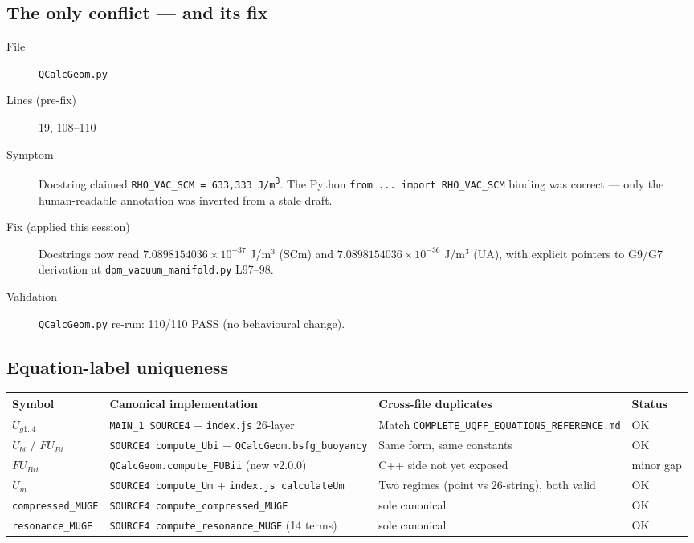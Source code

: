 \documentclass[11pt]{article}
\begin{document}
\subsection{The only conflict --- and its fix}
\label{sec:conflict}
\begin{description}
  \item[File] \texttt{QCalcGeom.py}
  \item[Lines (pre-fix)] 19, 108--110
  \item[Symptom] Docstring claimed \texttt{RHO\_VAC\_SCM = 633,333 J/m\textsuperscript{3}}. The Python \texttt{from ... import RHO\_VAC\_SCM} binding was correct --- only the human-readable annotation was inverted from a stale draft.
  \item[Fix (applied this session)] Docstrings now read $7.0898154036 \times 10^{-37}$ J/m$^3$ (SCm) and $7.0898154036 \times 10^{-36}$ J/m$^3$ (UA), with explicit pointers to G9/G7 derivation at \texttt{dpm\_vacuum\_manifold.py} L97--98.
  \item[Validation] \texttt{QCalcGeom.py} re-run: 110/110 PASS (no behavioural change).
\end{description}

\subsection{Equation-label uniqueness}
\begin{longtable}{p{2.5cm}p{6cm}p{5cm}p{1.2cm}}
\toprule
Symbol & Canonical implementation & Cross-file duplicates & Status \\
\midrule \endhead
$U_{g1..4}$ & \texttt{MAIN\_1 SOURCE4} + \texttt{index.js} 26-layer & Match \texttt{COMPLETE\_UQFF\_EQUATIONS\_REFERENCE.md} & OK \\
$U_{bi}$ / $FU_{Bi}$ & \texttt{SOURCE4 compute\_Ubi} + \texttt{QCalcGeom.bsfg\_buoyancy} & Same form, same constants & OK \\
$FU_{Bii}$ & \texttt{QCalcGeom.compute\_FUBii} (new v2.0.0) & C++ side not yet exposed & minor gap \\
$U_m$ & \texttt{SOURCE4 compute\_Um} + \texttt{index.js calculateUm} & Two regimes (point vs 26-string), both valid & OK \\
\texttt{compressed\_MUGE} & \texttt{SOURCE4 compute\_compressed\_MUGE} & sole canonical & OK \\
\texttt{resonance\_MUGE} & \texttt{SOURCE4 compute\_resonance\_MUGE} (14 terms) & sole canonical & OK \\
\bottomrule
\end{longtable}
\end{document}
